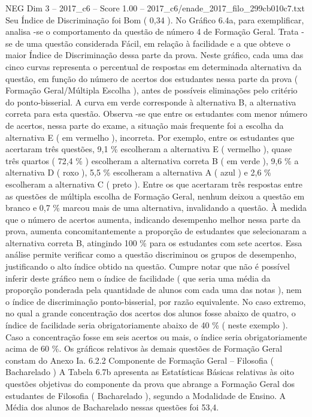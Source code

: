 \begin{textsample}{NEG Dim 3 – 2017\_c6 – Score 1.00 – 2017\_c6/enade\_2017\_filo\_299cb010c7.txt}
Seu Índice de Discriminação foi Bom ( 0,34 ).
No Gráfico 6.4a, para exemplificar, analisa -se o comportamento da questão de número 4 de Formação Geral.
Trata -se de uma questão considerada Fácil, em relação à facilidade e a que obteve o maior Índice de Discriminação dessa parte da prova.
Neste gráfico, cada uma das cinco curvas representa o percentual de respostas em determinada alternativa da questão, em função do número de acertos dos estudantes nessa parte da prova ( Formação Geral/Múltipla Escolha ), antes de possíveis eliminações pelo critério do ponto-bisserial.
A curva em verde corresponde à alternativa B, a alternativa correta para esta questão.
Observa -se que entre os estudantes com menor número de acertos, nessa parte do exame, a situação mais frequente foi a escolha da alternativa E ( em vermelho ), incorreta.
Por exemplo, entre os estudantes que acertaram três questões, 9,1 \% escolheram a alternativa E ( vermelho ), quase três quartos ( 72,4 \% ) escolheram a alternativa correta B ( em verde ), 9,6 \% a alternativa D ( roxo ), 5,5 \% escolheram a alternativa A ( azul ) e 2,6 \% escolheram a alternativa C ( preto ).
Entre os que acertaram três respostas entre as questões de múltipla escolha de Formação Geral, nenhum deixou a questão em branco e 0,7 \% marcou mais de uma alternativa, invalidando a questão.
À medida que o número de acertos aumenta, indicando desempenho melhor nessa parte da prova, aumenta concomitantemente a proporção de estudantes que selecionaram a alternativa correta B, atingindo 100 \% para os estudantes com sete acertos.
Essa análise permite verificar como a questão discriminou os grupos de desempenho, justificando o alto índice obtido na questão.
Cumpre notar que não é possível inferir deste gráfico nem o índice de facilidade ( que seria uma média da proporção ponderada pela quantidade de alunos com cada uma das notas ), nem o índice de discriminação ponto-bisserial, por razão equivalente.
No caso extremo, no qual a grande concentração dos acertos dos alunos fosse abaixo de quatro, o índice de facilidade seria obrigatoriamente abaixo de 40 \% ( neste exemplo ).
Caso a concentração fosse em seis acertos ou mais, o índice seria obrigatoriamente acima de 60 \%.
Os gráficos relativos às demais questões de Formação Geral constam do Anexo Ia. 6.2.2 Componente de Formação Geral – Filosofia ( Bacharelado ) A Tabela 6.7b apresenta as Estatísticas Básicas relativas às oito questões objetivas do componente da prova que abrange a Formação Geral dos estudantes de Filosofia ( Bacharelado ), segundo a Modalidade de Ensino.
A Média dos alunos de Bacharelado nessas questões foi 53,4.

\end{textsample}
